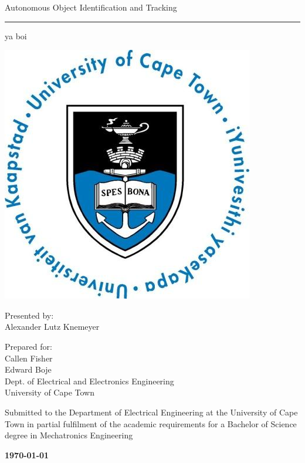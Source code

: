 \documentclass[a4paper,12pt]{report}
\begin{document}
\thispagestyle{empty}
{\Huge \begin{center}
Autonomous Object Identification and Tracking %
\hrule
{\Large ya boi} %
\end{center}}

\vskip 5mm
\begin{center}
\includegraphics[scale = 0.3]{uctLogo.png}
\end{center}

\vskip 5mm
\begin{center}
Presented by:\\
Alexander Lutz Knemeyer
\end{center}

\vskip 10mm
\begin{center}
Prepared for:\\
Callen Fisher \\
Edward Boje \\
Dept. of Electrical and Electronics Engineering\\University of Cape Town
\end{center}

\vskip 10mm
\begin{center}
Submitted to the Department of Electrical Engineering at the University of Cape Town in partial fulfilment of the academic requirements for a Bachelor of Science degree in Mechatronics Engineering
\end{center}

\vskip 5mm
\begin{center}{\bf \today}
\end{center}
\end{document}
